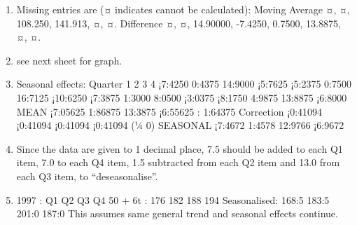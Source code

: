 \documentclass[a4paper,12pt]{article}
\begin{document}
\begin{enumerate}
    \item Missing entries are (¤ indicates cannot be calculated):
Moving Average ¤, ¤, 108.250, 141.913, ¤, ¤.
Difference ¤, ¤, 14.90000, -7.4250, 0.7500, 13.8875, ¤, ¤.
\item  see next sheet for graph.
\item  Seasonal effects:
Quarter 1 2 3 4
¡7:4250 0:4375 14:9000 ¡5:7625
¡5:2375 0:7500 16:7125 ¡10:6250
¡7:3875 1:3000 8:0500 ¡3:0375
¡8:1750 4:9875 13:8875 ¡6:8000
MEAN ¡7:05625 1:86875 13:3875 ¡6:55625 : 1:64375
Correction ¡0:41094 ¡0:41094 ¡0:41094 ¡0:41094 (¼ 0)
SEASONAL ¡7:4672 1:4578 12:9766 ¡6:9672
\item  Since the data are given to 1 decimal place, 7.5 should be added to each Q1
item, 7.0 to each Q4 item, 1.5 subtracted from each Q2 item and 13.0 from
each Q3 item, to “deseasonalise”.
\item 
1997 : Q1 Q2 Q3 Q4
50 + 6t : 176 182 188 194
Seasonalised: 168:5 183:5 201:0 187:0
This assumes same general trend and seasonal effects continue.
\end{enumerate}
\end{document}

